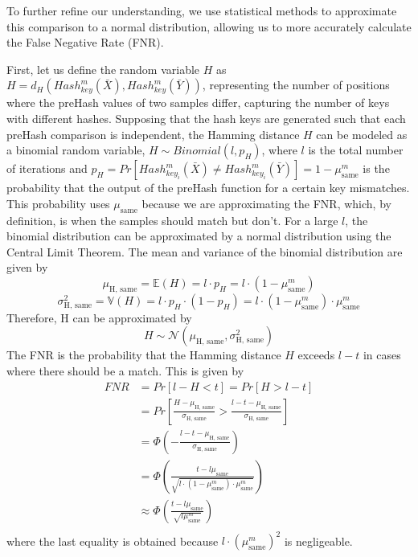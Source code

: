 To further refine our understanding, we use statistical methods to approximate this comparison to a normal distribution, allowing us to more accurately calculate the False Negative Rate (FNR). 

First, let us define the random variable $H$ as \(H = d_H(Hash_{key}^m(\bar{X}), Hash_{key}^m(\bar{Y}))\), representing the number of positions where the preHash values of two samples differ, capturing the number of keys with different hashes. Supposing that the hash keys are generated such that each preHash comparison is independent, the Hamming distance $H$ can be modeled as a binomial random variable, \(H \sim Binomial(l, p_H)\), where $l$ is the total number of iterations and $p_H = Pr[Hash_{key_i}^m(\bar{X}) \neq Hash_{key_i}^m(\bar{Y})] = 1 - \mu_{\text{same}}^m$ is the probability that the output of the preHash function for a certain key mismatches. This probability uses $\mu_{\text{same}}$ because we are approximating the FNR, which, by definition, is when the samples should match but don't. 
\newline For a large $l$, the binomial distribution can be approximated by a normal distribution using the Central Limit Theorem. The mean and variance of the binomial distribution are given by
\[
\mu_{\text{H, same}} = \mathbb{E}(H) = l \cdot p_H = l \cdot (1 - \mu_{\text{same}}^m)    
\]
\[
\sigma_{\text{H, same}}^2 = \mathbb{V}(H) = l \cdot p_H \cdot (1 - p_H) = l \cdot (1 - \mu_{\text{same}}^m) \cdot \mu_{\text{same}}^m   
\]
Therefore, H can be approximated by
\[
H \sim \mathcal{N}(\mu_{\text{H, same}}, \sigma_{\text{H, same}}^2)    
\]
The FNR is the probability that the Hamming distance $H$ exceeds $l - t$ in cases where there should be a match. This is given by
\begin{equation}
    \begin{aligned}
        \label{eq:fnr}
        FNR &= Pr[l - H < t] = Pr[H > l - t] \\
        &= Pr\left[\frac{H - \mu_{\text{H, same}}}{\sigma_{\text{H, same}}} > \frac{l - t - \mu_{\text{H, same}}}{\sigma_{\text{H, same}}}\right] \\
        &= \Phi \left( - \frac{l - t - \mu_{\text{H, same}}}{\sigma_{\text{H, same}}}\right) \\
        &= \Phi \left(\frac{t - l\mu_{\text{same}}}{\sqrt{l \cdot (1 - \mu_{\text{same}}^m) \cdot \mu_{\text{same}}^m}}\right) \\
        &\approx \Phi \left(\frac{t - l\mu_{\text{same}}}{\sqrt{l\mu_{\text{same}}^m}}\right) \\
    \end{aligned}        
\end{equation}
where the last equality is obtained because $l\cdot(\mu_{\text{same}}^m)^2$ is negligeable. 

